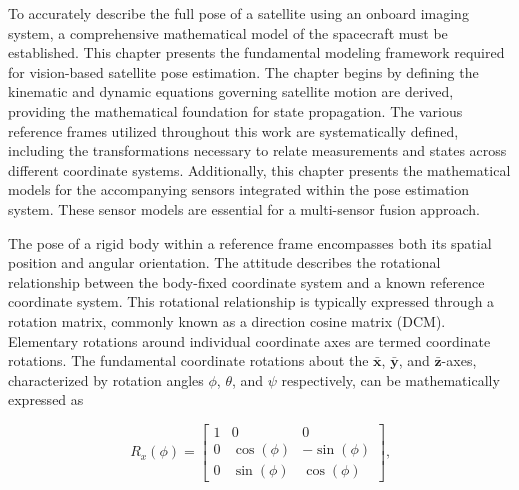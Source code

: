 \label{chap:modelling}

\label{sec:modintro}

To accurately describe the full pose of a satellite using an onboard imaging system, a comprehensive mathematical model 
of the spacecraft must be established. This chapter presents the fundamental modeling framework required for vision-based 
satellite pose estimation. The chapter begins by defining the kinematic and dynamic equations governing satellite motion are derived, providing the mathematical 
foundation for state propagation. The various reference frames utilized throughout this work are systematically 
defined, including the transformations necessary to relate measurements and states across different coordinate systems.
Additionally, this chapter presents the mathematical models for the accompanying sensors integrated within the pose estimation system. 
These sensor models are essential for a multi-sensor fusion approach.

\label{sec:modrigid}

\label{sec:kinematics}

The pose of a rigid body within a reference frame encompasses both its spatial position and angular orientation. The 
attitude describes the rotational relationship between the body-fixed coordinate system and a known reference coordinate system. 
This rotational relationship is typically expressed through a rotation matrix, commonly known as a direction cosine matrix (DCM)\cite{Jongh,Korf,Jordaan,Diebel}.
Elementary rotations around individual coordinate axes are termed coordinate rotations. The fundamental coordinate rotations about 
the $\bar{\mathbf{x}}$, $\bar{\mathbf{y}}$, and $\bar{\mathbf{z}}$-axes, characterized by rotation angles $\phi$, $\theta$, and $\psi$ respectively, can be mathematically expressed as

\begin{equation}
    R_x(\phi) = \begin{bmatrix} 
        1 & 0 & 0 \\
        0 & \cos(\phi) & -\sin(\phi) \\
        0 & \sin(\phi) & \cos(\phi)
    \end{bmatrix}
    \text{,}
    \label{Eq:3.1}
\end{equation}

